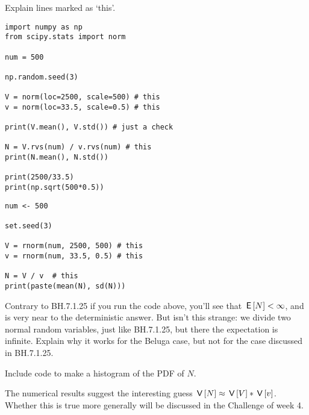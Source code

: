 \begin{exercise}
Explain lines marked as `this'.

\begin{verbatim}
import numpy as np
from scipy.stats import norm

num = 500

np.random.seed(3)

V = norm(loc=2500, scale=500) # this
v = norm(loc=33.5, scale=0.5) # this

print(V.mean(), V.std()) # just a check

N = V.rvs(num) / v.rvs(num) # this
print(N.mean(), N.std())

print(2500/33.5)
print(np.sqrt(500*0.5))
\end{verbatim}

\begin{verbatim}
num <- 500

set.seed(3)

V = rnorm(num, 2500, 500) # this
v = rnorm(num, 33.5, 0.5) # this

N = V / v  # this
print(paste(mean(N), sd(N)))

\end{verbatim}
\end{exercise}


\begin{exercise}
Contrary to BH.7.1.25 if you run the code above, you'll see that $\,\mathsf{E}\left[N\right] < \infty$, and is very near to the deterministic answer.
But isn't this strange: we divide two normal random variables, just like BH.7.1.25, but there the expectation is infinite.
Explain why it works for the Beluga case, but not for the case discussed in BH.7.1.25.
\end{exercise}

\begin{exercise}
Include code to make a histogram of the PDF of $N$.
\end{exercise}



\begin{remark}
The numerical results suggest the interesting guess $\,\mathsf{V}\left[N\right] \approx \,\mathsf{V}\left[V\right] * \,\mathsf{V}\left[v\right]$. Whether this is true more generally will be discussed in the Challenge of week 4.
\end{remark}

